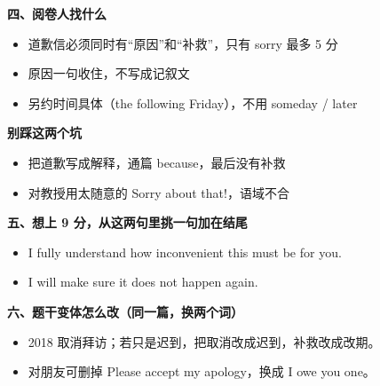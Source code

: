 \documentclass[11pt,a4paper]{ctexart}
\begin{document}
\vspace{5pt}
\noindent\begin{minipage}[t]{0.555\linewidth}
{\color{accent}\bfseries 四、阅卷人找什么}\par
{\footnotesize\begin{itemize}[leftmargin=1.2em,itemsep=1pt,topsep=1pt,parsep=0pt]\setlength{\leftmargin}{1.1em}
\item 道歉信必须同时有“原因”和“补救”，只有 sorry 最多 5 分
\item 原因一句收住，不写成记叙文
\item 另约时间具体（the following Friday），不用 someday / later
\end{itemize}}
\end{minipage}\hfill
\begin{minipage}[t]{0.415\linewidth}
{\color{hot}\bfseries 别踩这两个坑}\par
{\footnotesize\begin{itemize}[leftmargin=1.2em,itemsep=1pt,topsep=1pt,parsep=0pt]\setlength{\leftmargin}{1.1em}
\item 把道歉写成解释，通篇 because，最后没有补救
\item 对教授用太随意的 Sorry about that!，语域不合
\end{itemize}}
\end{minipage}\par

\vspace{6pt}
{\color{accent}\bfseries 五、想上 9 分，从这两句里挑一句加在结尾}\par
\vspace{2pt}
{\footnotesize
\begin{itemize}[leftmargin=1.2em,itemsep=1.5pt,topsep=1pt,parsep=0pt]
\item I fully understand how inconvenient this must be for you.
\item I will make sure it does not happen again.
\end{itemize}}\par

\vspace{6pt}
{\color{accent}\bfseries 六、题干变体怎么改（同一篇，换两个词）}\par
\vspace{2pt}
{\footnotesize
\begin{itemize}[leftmargin=1.2em,itemsep=1.5pt,topsep=1pt,parsep=0pt]
\item 2018 取消拜访；若只是迟到，把取消改成迟到，补救改成改期。
\item 对朋友可删掉 Please accept my apology，换成 I owe you one。
\end{itemize}}\par
\end{document}
